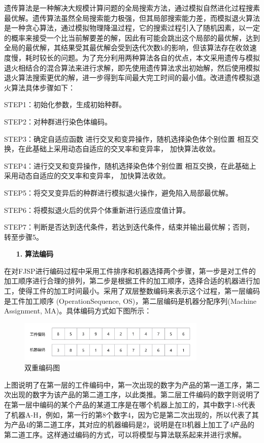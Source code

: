 \documentclass{whutmod}
\begin{document}
\begin{spacing}{1.2}
遗传算法是一种解决大规模计算问题的全局搜索方法\cite{4}，通过模拟自然进化过程搜素最优解。遗传算法虽然全局搜索能力极强，但其局部搜索能力差，而模拟退火算法是一种贪心算法，通过模拟物理降温过程，它的搜索过程引入了随机因素，以一定的概率来接受一个比当前解要差的解，因此有可能会跳出这个局部的最优解，达到全局的最优解，其结果受其最优解会受到迭代次数k的影响，但该算法存在收敛速度慢，耗时较长的问题。为了充分利用两种算法各自的优点，本文采用遗传与模拟退火相结合的混合算法来进行求解，即先使用遗传算法求出初始解，然后使用模拟退火算法\cite{1}搜索更优的解，进一步得到车间最大完工时间的最小值。改进遗传模拟退火算法具体步骤如下：

STEP1：初始化参数，生成初始种群。

STEP2：对种群进行染色体编码。 

STEP3：确定自适应函数 进行交叉和变异操作，随机选择染色体个别位置 相互交换，在此基础上采用动态自适应的交叉率和变异率， 加快算法收敛。

STEP4：进行交叉和变异操作，随机选择染色体个别位置 相互交换，在此基础上采用动态自适应的交叉率和变异率， 加快算法收敛。 

STEP5：将交叉变异后的种群进行模拟退火操作，避免陷入局部最优解。

STEP6：将模拟退火后的优异个体重新进行适应度值计算。

STEP7：判断是否达到迭代条件，若达到迭代条件，结束并输出最优解；否则，转至步骤5。

\begin{itemize}
	    \item[\textbf{1.}] \textbf{算法编码}
	\end{itemize}

 在对FJSP进行编码过程中采用工件排序和机器选择两个步骤，第一步是对工件的加工顺序进行合理的排列，第二步是根据工件的加工顺序，选择合适的机器进行加工，使得工件的加工时间最小。采用了双层整数编码来表示这个过程，第一层编码是工件加工顺序 (OperationSequence, OS)，第二层编码是机器分配序列(Machine Assignment, MA)。具体编码方式如下图所示：
 
		\begin{figure}[H]
		\centering
		\includegraphics[width=0.8\textwidth]{编码.png}
		\caption{双重编码图}
	\end{figure}

上图说明了在第一层的工件编码中，第一次出现的数字为产品的第一道工序，第二次出现的数字为该产品的第二道工序，以此类推。第二层工件编码的数字则说明了在第一层中编码的某个产品的某道工序是在哪个机器上加工的，其中数字1-8代表了机器A-H，例如，第一行的第8个数字4，因为它是第二次出现的，所以代表了其为产品4的第二道工序，其对应的机器编码是2，说明是在B机器上加工了4产品的第二道工序。这样通过编码的方式，可以将模型与算法联系起来并进行求解。


\end{spacing}
\end{document}

